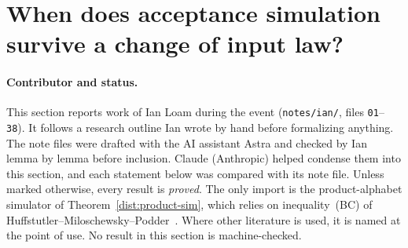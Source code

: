 \providecommand{\Cov}{\operatorname{Cov}}
\providecommand{\R}{\mathbb R}
\providecommand{\Hard}{\operatorname{Hard}}

\section{When does acceptance simulation survive a change of input law?}\label{sec:distributional}

\paragraph{Contributor and status.}
This section reports work of Ian Loam during the event (\texttt{notes/ian/},
files \texttt{01}--\texttt{38}). It follows a research outline Ian wrote by hand
before formalizing anything. The note files were drafted with the AI assistant
Astra and checked by Ian lemma by lemma before inclusion. Claude (Anthropic)
helped condense them into this section, and each statement below was compared
with its note file. Unless marked otherwise, every result is \emph{proved}. The
only import is the product-alphabet simulator of
Theorem~\ref{dist:product-sim}, which relies on inequality~(BC) of
Huffstutler--Miloschewsky--Podder~\cite{HMP26}. Where other literature is used,
it is named at the point of use. No result in this section is machine-checked.

